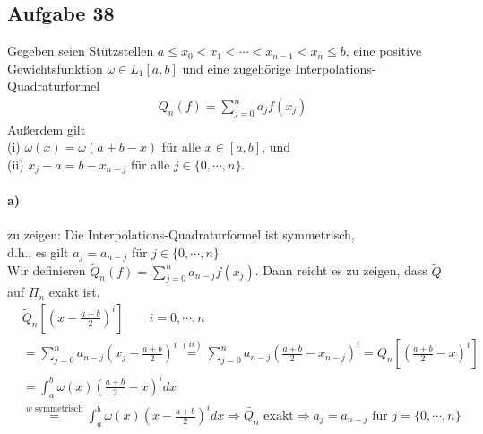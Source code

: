 \subsection*{Aufgabe 38}
Gegeben seien Stützstellen $a \le x_0 <  x_1 <  \cdots < x_{n-1} < x_n \le b$, eine positive Gewichtsfunktion $ \omega \in L_1[a,b]$ und eine zugehörige Interpolations-Quadraturformel
\begin{align*}
Q_n(f)=\sum_{j=0}^{n}a_jf(x_j)
\end{align*}
Außerdem gilt\\
(i) $\omega(x)=\omega(a+b-x)$ für alle $x \in [a,b]$, und\\
(ii) $x_j-a=b-x_{n-j}$ für alle $j\in\{0,\cdots,n\}$.
\paragraph{a)} zu zeigen: Die Interpolations-Quadraturformel ist symmetrisch,\\ d.h., es gilt $a_j=a_{n-j}$ für $j\in\{0,\cdots,n\}$ \\
\newline
Wir definieren $\tilde{Q}_n(f)=\sum_{j=0}^{n}a_{n-j}f(x_j)$. Dann reicht es zu zeigen, dass $\tilde{Q}$ auf $\Pi_n$ exakt ist.\\
\begin{align*}
&\tilde{Q}_n \left[\left(x-\frac{a+b}{2}\right)^i \right]\qquad i=0,\cdots, n\\
&=\sum_{j=0}^{n}a_{n-j}\left(x_j-\frac{a+b}{2}\right)^i\overset{(ii)}{=}\sum_{j=0}^{n}a_{n-j}\left(\frac{a+b}{2}-x_{n-j}\right)^i=Q_n\left[\left(\frac{a+b}{2}-x\right)^i \right]\\
&=\int_a^b \omega(x)\left(\frac{a+b}{2}-x\right)^i dx\\
&\overset{w \text{ symmetrisch}}{=}\int_a^b \omega (x)\left(x-\frac{a+b}{2}\right)^i dx \Rightarrow \tilde{Q_n} \text{ exakt} \Rightarrow a_j=a_{n-j} \text{ für } j=\{0,\cdots,n\} 
\end{align*}
